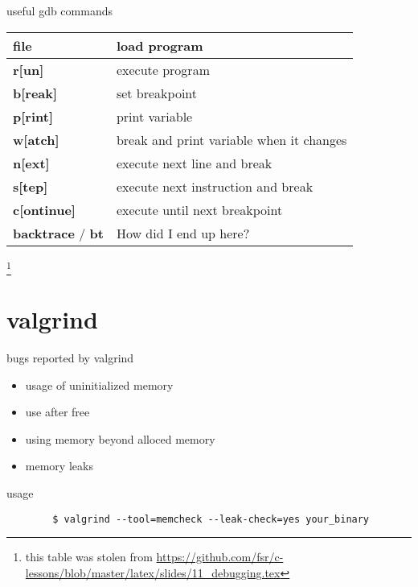 \documentclass[10pt,graphics,aspectratio=169,table]{beamer}
\begin{document}
\begin{frame}{useful gdb commands}
		\begin{tabular}{|l|l|}
			\hline
			\textbf{file} & load program\\\hline
			\textbf{r[un]} & execute program\\\hline
			\textbf{b[reak]} & set breakpoint\\\hline
			\textbf{p[rint]} & print variable\\\hline
			\textbf{w[atch]} & break and print variable when it changes\\\hline
			\textbf{n[ext]} & execute next line and break\\\hline
			\textbf{s[tep]} & execute next instruction and break\\\hline
			\textbf{c[ontinue]} & execute until next breakpoint\\\hline
			\textbf{backtrace} / \textbf{bt} & How did I end up here?\\\hline
		\end{tabular}
        \footnote{this table was stolen from \url{https://github.com/fsr/c-lessons/blob/master/latex/slides/11_debugging.tex}}
\end{frame}

\section{valgrind}
\begin{frame}{bugs reported by valgrind}
  \begin{itemize}
  \item usage of uninitialized memory
  \item use after free
  \item using memory beyond alloced memory
  \item memory leaks
  \end{itemize}
\end{frame}
\begin{frame}[fragile]{usage}
\begin{lstlisting}
        $ valgrind --tool=memcheck --leak-check=yes your_binary
\end{lstlisting}
\end{frame}
\end{document}
